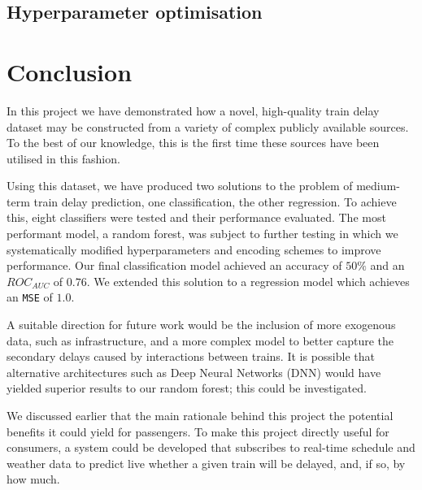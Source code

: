 \documentclass[12pt,a4paper]{article}
\begin{document}
\subsection{Hyperparameter optimisation}


\clearpage
\section{Conclusion}

In this project we have demonstrated how a novel, high-quality train delay dataset may be constructed from a variety of complex publicly available sources. To the best of our knowledge, this is the first time these sources have been utilised in this fashion.  

Using this dataset, we have produced two solutions to the problem of medium-term train delay prediction, one classification, the other regression. To achieve this, eight classifiers were tested and their performance evaluated. The most performant model, a random forest, was subject to further testing in which we systematically modified hyperparameters and encoding schemes to improve performance. Our final classification model achieved an accuracy of $50\%$ and an $ROC_{AUC}$ of $0.76$. We extended this solution to a regression model which achieves an \verb|MSE| of $1.0$. 

A suitable direction for future work would be the inclusion of more exogenous data, such as infrastructure, and a more complex model to better capture the secondary delays caused by interactions between trains. It is possible that alternative architectures such as Deep Neural Networks (DNN) would have yielded superior results to our random forest; this could be investigated. 

We discussed earlier that the main rationale behind this project the potential benefits it could yield for passengers. To make this project directly useful for consumers, a system could be developed that subscribes to real-time schedule and weather data to predict live whether a given train will be delayed, and, if so, by how much.  

\clearpage

\end{document}
